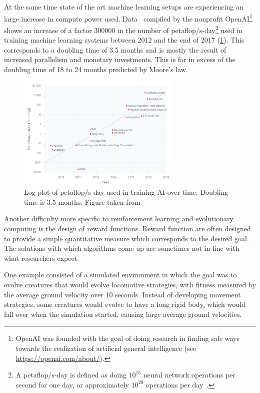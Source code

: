 \documentclass[11pt, a4paper]{report} %
\begin{document}
At the same time state of the art machine learning setups are experiencing an large increase in compute power used.
Data~\cite{amodei2018} compiled by the nonprofit OpenAI\footnote{OpenAI was founded with the goal of doing research in finding safe ways towards the realization of artificial general intelligence (see \href{https://openai.com/about/}{https://openai.com/about/}).} shows an increase of a factor 300000 in the number of petaflop/s-day\footnote{A petaflop/s-day is defined as doing $10^{15}$ neural network operations per second for one day, or approximately $10^{20}$ operations per day~\cite{amodei2018}.} used in training machine learning systems between 2012 and the end of 2017 (\cref{fig:increasedaiflops}). 
This corresponds to a doubling time of 3.5 months and is mostly the result of increased parallelism and monetary investments.
This is far in excess of the doubling time of 18 to 24 months predicted by Moore's law.

\begin{figure}[tb!]
  \centering
  \includegraphics[width=0.7\textwidth]{increaseaiflops.png}
  \caption{Log plot of petaflop/s-day used in training AI over time. Doubling time is 3.5 months. Figure taken from~\cite{amodei2018}}
  \label{fig:increasedaiflops}
\end{figure}

Another difficulty more specific to reinforcement learning and evolutionary computing is the design of reward functions.
Reward function are often designed to provide a simple quantitative measure which corresponds to the desired goal.
The solutions with which algorithms come up are sometimes not in line with what researchers expect.

One example consisted of a simulated environment in which the goal was to evolve creatures that would evolve locomotive strategies, with fitness measured by the average ground velocity over 10 seconds.
Instead of developing movement strategies, some creatures would evolve to have a long rigid body, which would fall over when the simulation started, causing large average ground velocities.
\end{document}
